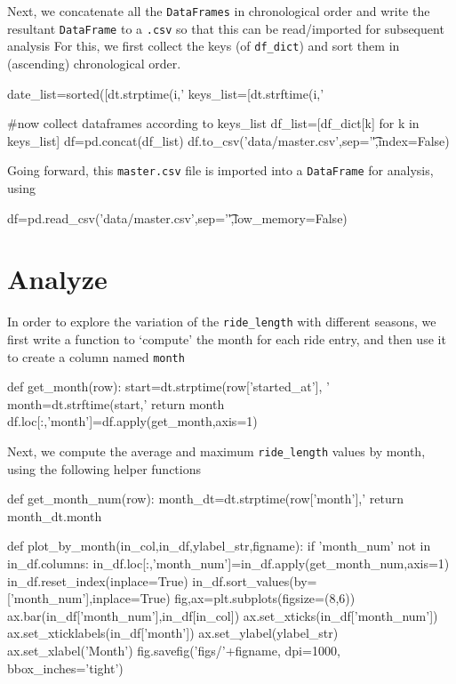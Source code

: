 \documentclass{article}
\begin{document}
Next, we concatenate all the \texttt{DataFrames} in chronological order and write the resultant \texttt{DataFrame} to a \texttt{.csv} so that this can be read/imported for subsequent analysis For this, we first collect the keys (of \texttt{df\_dict}) and sort them in (ascending) chronological order.

\begin{pythoncode}
date_list=sorted([dt.strptime(i,'%
keys_list=[dt.strftime(i,'%

#now collect dataframes according to keys_list
df_list=[df_dict[k] for k in keys_list]
df=pd.concat(df_list)
df.to_csv('data/master.csv',sep='\t',index=False)
\end{pythoncode}

Going forward, this \texttt{master.csv} file is imported into a \texttt{DataFrame} for analysis, using

\begin{pythoncode}
df=pd.read_csv('data/master.csv',sep='\t',low_memory=False)
\end{pythoncode}

\section{Analyze}

In order to explore the variation of the \texttt{ride\_length} with different seasons, we first write a function to `compute' the month for each ride entry, and then use it to create a column named \texttt{month}

\begin{pythoncode}
def get_month(row):
    start=dt.strptime(row['started_at'], '%
    month=dt.strftime(start,'%
    return month
df.loc[:,'month']=df.apply(get_month,axis=1)
\end{pythoncode}

Next, we compute the average and maximum \texttt{ride\_length} values by month, using the following helper functions

\begin{pythoncode}
def get_month_num(row):
    month_dt=dt.strptime(row['month'],'%
    return month_dt.month

def plot_by_month(in_col,in_df,ylabel_str,figname):
    if 'month_num' not in in_df.columns:
        in_df.loc[:,'month_num']=in_df.apply(get_month_num,axis=1)
    in_df.reset_index(inplace=True)
    in_df.sort_values(by=['month_num'],inplace=True)
    fig,ax=plt.subplots(figsize=(8,6))
    ax.bar(in_df['month_num'],in_df[in_col])
    ax.set_xticks(in_df['month_num'])
    ax.set_xticklabels(in_df['month'])
    ax.set_ylabel(ylabel_str)
    ax.set_xlabel('Month')
    fig.savefig('figs/'+figname, dpi=1000, bbox_inches='tight')
\end{pythoncode}
\end{document}

